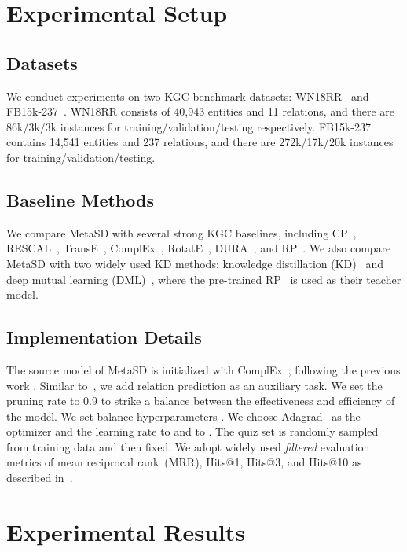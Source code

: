 \documentclass[11pt]{article}
\begin{document}
\section{Experimental Setup}
\subsection{Datasets}
We conduct experiments on two KGC benchmark datasets: WN18RR~\citep{toutanova2015observed} and FB15k-237~\citep{dettmers2018convolutional}. WN18RR consists of 40,943 entities and 11 relations, and there are 86k/3k/3k instances for training/validation/testing respectively. FB15k-237 contains 14,541 entities and 237 relations, and there are 272k/17k/20k instances for training/validation/testing.





\subsection{Baseline Methods}
We compare  MetaSD with several strong KGC baselines, including CP~\citep{hit1927},  RESCAL~\citep{nickel2011three}, TransE~\citep{bordes2013translating}, ComplEx~\citep{trouillon2016complex},
RotatE~\citep{sun2019rotate},
DURA~\citep{zhang2020duality}, and RP~\citep{chen2021relation}.  We also compare MetaSD with two widely used KD methods: knowledge distillation (KD)~\citep{hinton2015distilling} and deep mutual learning (DML)~\citep{zhang2018deep}, where the pre-trained RP~\citep{chen2021relation} is used as their teacher model. 

\subsection{Implementation Details}
The source model of MetaSD is initialized with ComplEx~\citep{trouillon2016complex}, following the previous work \citep{zhang2020duality}. Similar to~\citet{chen2021relation}, we add relation prediction as an auxiliary task. We set the pruning rate  to 0.9 to strike a balance between the effectiveness and efficiency of the model.
We set balance hyperparameters . We choose Adagrad~\citep{duchi2011adaptive} as the optimizer and the learning rate  to  and  to . The quiz set is randomly sampled from training data and then fixed. We adopt widely used \textit{filtered} evaluation metrics of mean reciprocal rank~(MRR), Hits@1, Hits@3, and Hits@10 as described in~\cite{bordes2013translating}.

\section{Experimental Results}
\end{document}
